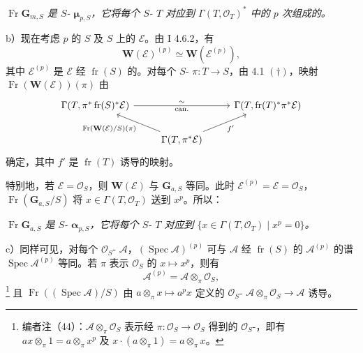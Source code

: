 \emph{$\operatorname{Fr}\mathbf G_{m,S}$ 是 $S$- $\boldsymbol\mu_{p,S}$，它将每个 $S$- $T$ 对应到 $\Gamma(T,\mathcal O_T)^*$ 中的 $p$ 次组成的。}

 b）现在考虑 $p$ 的 $S$ 及 $S$ 上的 $\mathcal E$。由 I 4.6.2，有
\[
\mathbf W(\mathcal E)^{(p)}\simeq\mathbf W(\mathcal E^{(p)}),
\]
其中 $\mathcal E^{(p)}$ 是 $\mathcal E$ 经 $\operatorname{fr}(S)$ 的。对每个 $S$- $\pi:T\to S$，由 4.1 $(\dagger)$，映射 $\operatorname{Fr}(\mathbf W(\mathcal E))(\pi)$ 由
\[
\begin{tikzcd}
\Gamma(T,\pi^*\operatorname{fr}(S)^*\mathcal E)\arrow[rr,"\sim","\mathrm{can.}"']&&\Gamma(T,\operatorname{fr}(T)^*\pi^*\mathcal E)\\
&\Gamma(T,\pi^*\mathcal E)\arrow[ul,"\operatorname{Fr}(\mathbf W(\mathcal E)/S)(\pi)"]\arrow[ur,"f'"']&
\end{tikzcd}
\]
确定，其中 $f'$ 是 $\operatorname{fr}(T)$ 诱导的映射。

特别地，若 $\mathcal E=\mathcal O_S$，则 $\mathbf W(\mathcal E)$ 与 $\mathbf G_{a,S}$ 等同。此时 $\mathcal E^{(p)}=\mathcal E=\mathcal O_S$， $\operatorname{Fr}(\mathbf G_{a,S}/S)$ 将 $x\in\Gamma(T,\mathcal O_T)$ 送到 $x^p$。所以：

\emph{$\operatorname{Fr}\mathbf G_{a,S}$ 是 $S$- $\boldsymbol\alpha_{p,S}$，它将每个 $S$- $T$ 对应到 $\{x\in\Gamma(T,\mathcal O_T)\mid x^p=0\}$。}

 c）同样可见，对每个 $\mathcal O_S$- $\mathcal A$，$(\operatorname{Spec}\mathcal A)^{(p)}$ 可与 $\mathcal A$ 经 $\operatorname{fr}(S)$ 的 $\mathcal A^{(p)}$ 的谱 $\operatorname{Spec}\mathcal A^{(p)}$ 等同。若 $\pi$ 表示 $\mathcal O_S$ 的 $x\mapsto x^p$，则有
\[
\mathcal A^{(p)}=\mathcal A\otimes_\pi\mathcal O_S,
\]
\footnote{编者注（44）：$\mathcal A\otimes_\pi\mathcal O_S$ 表示经 $\pi:\mathcal O_S\to\mathcal O_S$ 得到的 $\mathcal O_S$-，即有 $ax\otimes_\pi1=a\otimes_\pi x^p$ 及 $x\cdot(a\otimes_\pi1)=a\otimes_\pi x$。}
且 $\operatorname{Fr}((\operatorname{Spec}\mathcal A)/S)$ 由 $a\otimes_\pi x\mapsto a^px$ 定义的 $\mathcal O_S$- $\mathcal A\otimes_\pi\mathcal O_S\to\mathcal A$ 诱导。

